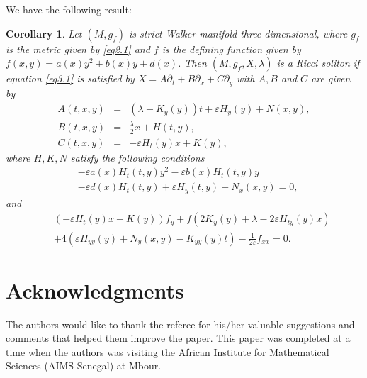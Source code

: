 \documentclass[reqno, 12pt]{amsart}
\numberwithin{equation}{section}
\newtheorem{corollary}[theorem]{Corollary}
\begin{document}
We have the following result:
\begin{corollary}
Let $(M, g_f)$ is strict Walker manifold three-dimensional, where $g_f$ is the metric given by \eqref{eq2.1} and $f$ is the defining function given by 
$f(x,y)=a(x) y^{2}+b(x) y+d(x)$.  Then $(M, g_f, X, \lambda)$ is a Ricci soliton if 
equation \eqref{eq3.1} is satisfied by $X = A\partial_t+ B\partial_x + C \partial_y $ 
with $A, B $ and $C$ are given by
\begin{eqnarray}\label{eq3.12}
A(t,x, y) &=& \left( \lambda - K_y(y)\right)t+\varepsilon H_{y}(y) +N(x,y), \nonumber\\ 
B(t,x,y) &=&\frac{\lambda}{2}x + H(t,y),\nonumber\\
C(t,x,y) &=& -\varepsilon H_{t}(y)x+K(y),
\end{eqnarray}
where $H,K,N$ satisfy the following conditions
\begin{align*}
&	- \varepsilon a(x)H_{t}(t,y) y^{2} - \varepsilon b(x)H_{t}(t,y) y\\
&-\varepsilon d(x)H_{t}(t,y)+\varepsilon H_{y}(t,y)+N_{x}(x,y)=0,
\end{align*}
 and
 \begin{align*}
&&\left(-\varepsilon H_{t}(y)x+K(y)\right) f_y+f\left( 2K_y(y) +\lambda
-2\varepsilon H_{ty}(y)x\right)  \\
 && + 4\left( \varepsilon H_{yy}(y) + N_y(x,y)-K_{yy}(y)t\right) 
 - \frac{1}{2\varepsilon}f_{xx}=0.
 \end{align*}	
\end{corollary}

\section*{Acknowledgments}
The authors would like to thank the referee for his/her valuable suggestions and comments that helped them improve the paper. This paper was completed at a
time when the authors was visiting the African Institute for Mathematical Sciences
(AIMS-Senegal) at Mbour.
\end{document}
